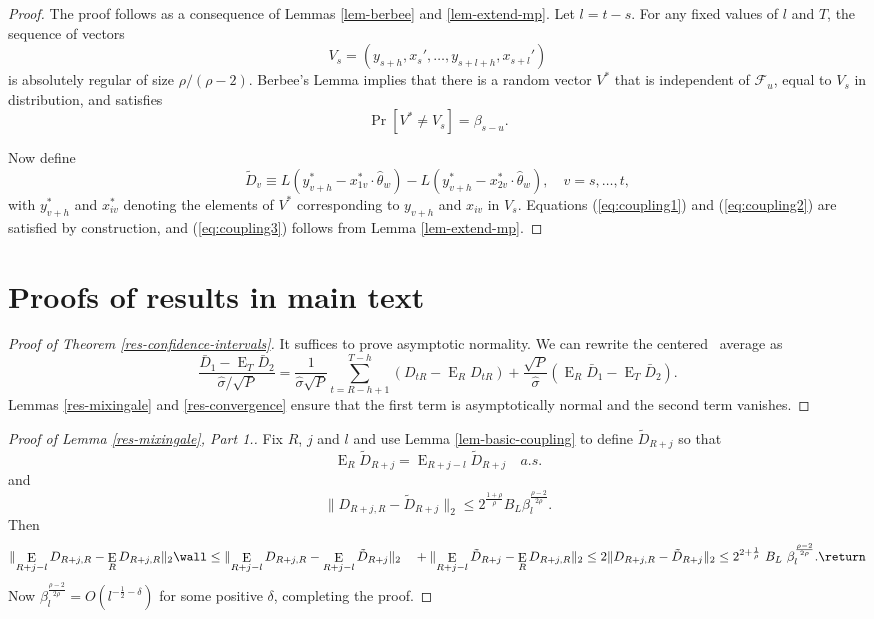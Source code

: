 \documentclass[11pt]{article}
\DeclareMathOperator{\E}{E}
\newcommand{\oosSum}[2]{\ensuremath{\sum_{#1=R-\h+#2}^{T-\h}}}
\newcommand{\h}{h}
\newcommand{\CenteredAverage}{\frac{\bar{D}_1 - \E_T\bar{D}_2}{\hat\sigma / \sqrt{P}}}
\newcommand{\CenteredAverageI}{\ensuremath{\frac{1}{\hat\sigma
    \sqrt{P}}\oosSum{t}{1} (D_{tR} - \E_R D_{tR})}}
\newcommand{\CenteredAverageII}{\ensuremath{\frac{\sqrt{P}}{\hat\sigma}
    (\E_R\bar D_1 - \E_T\bar{D}_2)}}
\newcommand{\couplingConstant}{\ensuremath{2^{\frac{1+\rho}{\rho}} B_L}}
\newcommand{\couplingBeta}[1]{\ensuremath{\beta^{\frac{\rho-2}{2\rho}}_{#1}}}
\newcommand{\couplingBound}[1]{\couplingConstant \couplingBeta{#1}}
\begin{document}
\begin{proof}
  The proof follows as a consequence of Lemmas \ref{lem-berbee} and
  \ref{lem-extend-mp}.  Let $l = t-s$.  For any fixed values of $l$
  and $T$, the sequence of vectors
  \[ V_s = (y_{s+\h}, x_{s}', \dots, y_{s+l+\h}, x_{s+l}') \] is
  absolutely regular of size $\rho/(\rho-2)$.  Berbee's Lemma implies
  that there is a random vector $V^*$ that is independent of
  $\mathcal{F}_u$, equal to $V_s$ in distribution, and satisfies
  \[\Pr[V^* \neq V_s] = \beta_{s-u}.\]

  Now define
  \[ \tilde D_v \equiv L(y_{v+\h}^* - x_{1v}^* \cdot
  \hat{\theta}_w) - L(y_{v+\h}^* - x_{2v}^* \cdot
  \hat{\theta}_w), \quad v = s,\dotsc, t,
  \]
  with $y_{v+\h}^*$ and $x_{iv}^*$ denoting the elements of $V^*$
  corresponding to $y_{v+\h}$ and $x_{iv}$ in $V_s$.  Equations
  (\ref{eq:coupling1}) and (\ref{eq:coupling2}) are satisfied by
  construction, and (\ref{eq:coupling3}) follows from Lemma
  \ref{lem-extend-mp}.
\end{proof}

\section{Proofs of results in main text}
\begin{proof}[Proof of Theorem \ref{res-confidence-intervals}]
It suffices to prove asymptotic normality.  We can rewrite the
centered \oos\ average as
  \[
    \CenteredAverage = \CenteredAverageI + \CenteredAverageII.
  \]
Lemmas \ref{res-mixingale} and 
\ref{res-convergence} ensure that the first term is asymptotically
normal and the second term vanishes.
\end{proof}

\begin{proof}[Proof of Lemma \ref{res-mixingale}, Part 1.]
Fix $R$, $j$ and $l$ and use Lemma
\ref{lem-basic-coupling} to define $\tilde{D}_{R+j}$ so that
\[\E_R\tilde D_{R+j} = \E_{R+j-l} \tilde D_{R+j} \quad a.s. \]
and
\[\lVert D_{R+j,R} - \tilde D_{R+j} \rVert_2 \leq \couplingBound{l}.\]
Then
\[
\lVert \E_{R+j-l} D_{R+j,R} - \E_R D_{R+j,R} \rVert_2 \wall \leq 
\lVert \E_{R+j-l} D_{R+j,R} - \E_{R+j-l} \tilde{D}_{R+j} \rVert_2 \\
\quad + \lVert
\E_{R+j-l} \tilde{D}_{R+j} - \E_R D_{R+j,R} \rVert_2 \\
\leq 2 \lVert D_{R+j,R} - \tilde D_{R+j} \rVert_2 \\
\leq 2^{2 + \frac1\rho}\ B_L\ \couplingBeta{l}.\return
\]
Now $\couplingBeta{l} = O(l^{-\frac12 - \delta})$ for some
positive $\delta$, completing the proof.
\end{proof}
\end{document}
